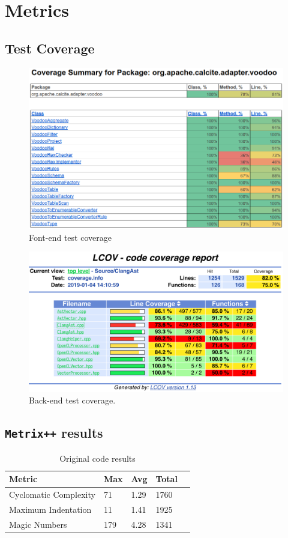 \chapter{Metrics}
\label{appendix:metrics}

\section{Test Coverage}

\begin{figure}[H]
    \centering
    \includegraphics[width=0.7\linewidth]{evaluation/frontend-coverage.png}
    \caption{Font-end test coverage}
    \label{fig:fontend-cov}
\end{figure}

\begin{figure}[H]
    \centering
    \includegraphics[width=0.75\linewidth]{evaluation/backend-coverage.png}
    \caption{Back-end test coverage.}
    \label{fig:backend-cov}
\end{figure}

\section{\texttt{Metrix++} results}

\begin{table}[H]
    \centering
    \begin{tabular}{@{}lllll@{}}
        \toprule
        \textbf{Metric}       & \textbf{Max} & \textbf{Avg} & \textbf{Total} \\ \midrule
        Cyclomatic Complexity & 71           & 1.29         & 1760           \\
        Maximum Indentation   & 11           & 1.41         & 1925           \\
        Magic Numbers         & 179          & 4.28         & 1341           \\ \bottomrule
    \end{tabular}
    \caption{\label{table:original-metrics}Original code results}
\end{table}


